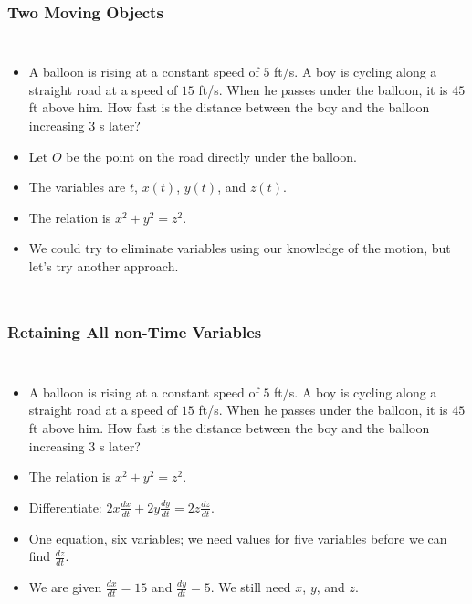 \documentclass[serif,ignorenonframetext]{beamer}
\newcommand{\ds}{\displaystyle}
\begin{document}
\begin{frame}
  \frametitle{Two Moving Objects}
  \begin{columns}
  \begin{itemize}[<+->]
  \item A balloon is rising at a constant speed of $5$ ft/s.  A boy is
    cycling along a straight road at a speed of $15$ ft/s.  When he
    passes under the balloon, it is $45$ ft above him.  How fast is
    the distance between the boy and the balloon increasing $3$ s later?
  \item Let $O$ be the point on the road directly under the balloon.
  \item The variables are $t$, $x(t)$, $y(t)$, and $z(t)$.
  \item The relation is $x^2+y^2=z^2$.
  \item We could try to eliminate variables using our knowledge of
    the motion, but let's try another approach.
  \end{itemize}
  \end{columns}
\end{frame}

\begin{frame}
  \frametitle{Retaining All non-Time Variables}
  \begin{columns}
  \begin{itemize}[<+->]
  \item A balloon is rising at a constant speed of $5$ ft/s.  A boy is
    cycling along a straight road at a speed of $15$ ft/s.  When he
    passes under the balloon, it is $45$ ft above him.  How fast is
    the distance between the boy and the balloon increasing $3$ s later?
  \item The relation is $x^2+y^2=z^2$.
  \item Differentiate: $\ds 2x \frac{dx}{dt} + 2y \frac{dy}{dt}
    = 2z \frac{dz}{dt}$.
  \item One equation, six variables; we need values for
    five variables before we can find $\ds \frac{dz}{dt}$.
  \item We are given $\ds \frac{dx}{dt} = 15$ and $\ds \frac{dy}{dt} = 5$.
    We still need $x$, $y$, and $z$.
  \end{itemize}
  \end{columns}
\end{frame}
\end{document}
